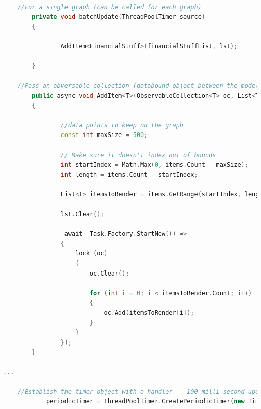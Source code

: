 \documentclass[]{article}
\begin{document}
\begin{lstlisting}[language=C++, caption=Example batch update code ,label={lst:csharpeble}]

	//For a single graph (can be called for each graph)
        private void batchUpdate(ThreadPoolTimer source)
        {
            
                AddItem<FinancialStuff>(financialStuffList, lst);                        

        }

	//Pass an obversable collection (databound object between the model and the view), and a list of items to append to the collection
        public async void AddItem<T>(ObservableCollection<T> oc, List<T> items)
        {

                //data points to keep on the graph
                const int maxSize = 500;

                // Make sure it doesn't index out of bounds
                int startIndex = Math.Max(0, items.Count - maxSize);
                int length = items.Count - startIndex;

                List<T> itemsToRender = items.GetRange(startIndex, length);

                lst.Clear();

                 await  Task.Factory.StartNew(() =>                
                {
                    lock (oc)
                    {
                        oc.Clear();

                        for (int i = 0; i < itemsToRender.Count; i++)
                        {
                            oc.Add(itemsToRender[i]);
                        }
                    }
                });
        }

...

	//Establish the timer object with a handler -  100 milli second update
            periodicTimer = ThreadPoolTimer.CreatePeriodicTimer(new TimerElapsedHandler(batchUpdate);, new TimeSpan(0, 0, 0, 0, 100000));
\end{lstlisting}
\end{document}
